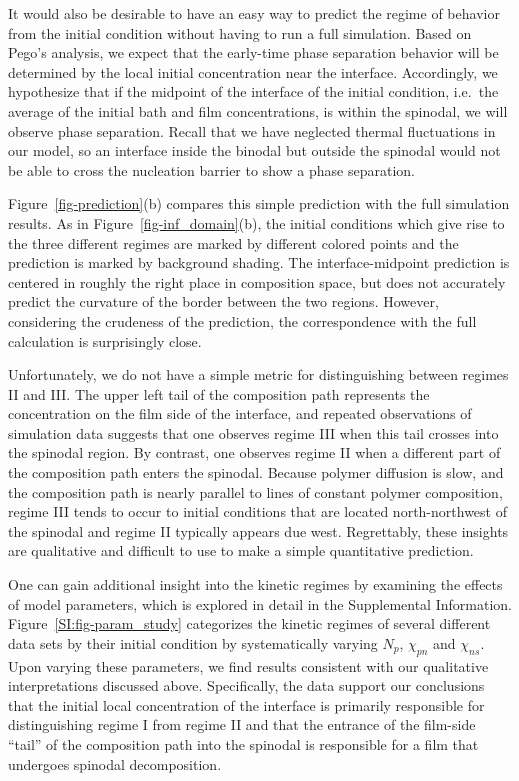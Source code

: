 \documentclass[journal=mamobx, layout=twocolumn]{achemso}
\begin{document}
It would also be desirable to have an easy way to predict the regime of behavior from the initial condition without having to run a full simulation.
Based on Pego's analysis, we expect that the early-time phase separation behavior will be determined by the local initial concentration near the interface.
Accordingly, we hypothesize that if the midpoint of the interface of the initial condition, i.e.\ the average of the initial bath and film concentrations, is within the spinodal, we will observe phase separation.
Recall that we have neglected thermal fluctuations in our model, so an interface inside the binodal but outside the spinodal would not be able to cross the nucleation barrier to show a phase separation.

Figure~\ref{fig-prediction}(b) compares this simple prediction with the full simulation results.
As in Figure~\ref{fig-inf_domain}(b), the initial conditions which give rise to the three different regimes are marked by different colored points and the prediction is marked by background shading.
The interface-midpoint prediction is centered in roughly the right place in composition space, but does not accurately predict the curvature of the border between the two regions.
However, considering the crudeness of the prediction, the correspondence with the full calculation is surprisingly close.

Unfortunately, we do not have a simple metric for distinguishing between regimes II and III.
The upper left tail of the composition path represents the concentration on the film side of the interface, and repeated observations of simulation data suggests that one observes regime III when this tail crosses into the spinodal region.
By contrast, one observes regime II when a different part of the composition path enters the spinodal.
Because polymer diffusion is slow, and the composition path is nearly parallel to lines of constant polymer composition, regime III tends to occur to initial conditions that are located north-northwest of the spinodal and regime II typically appears due west.
Regrettably, these insights are qualitative and difficult to use to make a simple quantitative prediction.

One can gain additional insight into the kinetic regimes by examining the effects of model parameters, which is explored in detail in the Supplemental Information.
Figure~\ref{SI:fig-param_study} categorizes the kinetic regimes of several different data sets by their initial condition by systematically varying $N_{p}$, $\chi_{pn}$ and $\chi_{ns}$.
Upon varying these parameters, we find results consistent with our qualitative interpretations discussed above. 
Specifically, the data support our conclusions that the initial local concentration of the interface is primarily responsible for distinguishing regime I from regime II and that the entrance of the film-side ``tail'' of the composition path into the spinodal is responsible for a film that undergoes spinodal decomposition.
\end{document}
